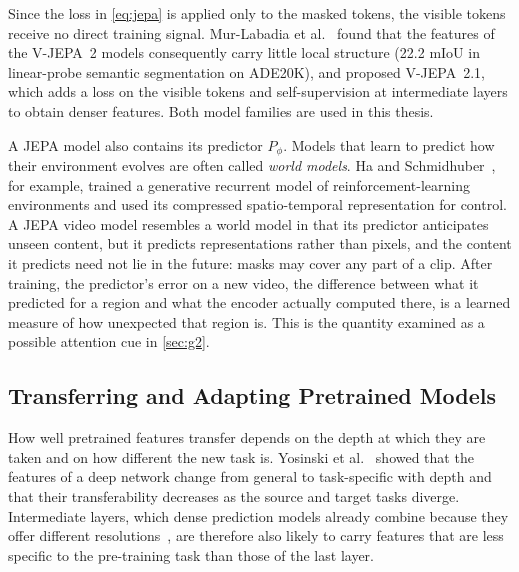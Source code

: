 Since the loss in \cref{eq:jepa} is applied only to the masked tokens, the
visible tokens receive no direct training signal. Mur-Labadia et
al.~\cite{murlabadia2026vjepa21} found that the features of the \acrshort{V-JEPA}~2 models
consequently carry little local structure (22.2 \acrshort{mIoU} in linear-probe semantic
segmentation on ADE20K), and proposed \acrshort{V-JEPA}~2.1, which adds a loss on the
visible tokens and self-supervision at intermediate layers to obtain denser
features. Both model families are used in this thesis.

A \acrshort{JEPA} model also contains its predictor $P_\phi$. Models that learn to predict
how their environment evolves are often called \emph{world models}. Ha and
Schmidhuber~\cite{ha2018recurrent}, for example, trained a generative recurrent
model of reinforcement-learning environments and used its compressed
spatio-temporal representation for control. A \acrshort{JEPA} video model
resembles a world model in that its predictor
anticipates unseen content, but it predicts representations rather than pixels,
and the content it predicts need not lie in the future: masks may cover any part
of a clip. After training, the predictor's error on a new video, the difference
between what it predicted for a region and what the encoder actually computed
there, is a learned measure of how unexpected that region is. This is the
quantity examined as a possible attention cue in \cref{sec:g2}.

\subsection{Transferring and Adapting Pretrained Models}\label{sec:transfer-learning}

How well pretrained features transfer depends on the depth at which they are
taken and on how different the new task is. Yosinski et
al.~\cite{yosinski2014transferable} showed that the features of a deep network
change from general to task-specific with depth and that their transferability
decreases as the source and target tasks diverge. Intermediate layers, which
dense prediction models already combine because they offer different
resolutions~\cite{lin2017feature,ranftl2021vision}, are therefore also likely to
carry features that are less specific to the pre-training task than those of
the last layer.

